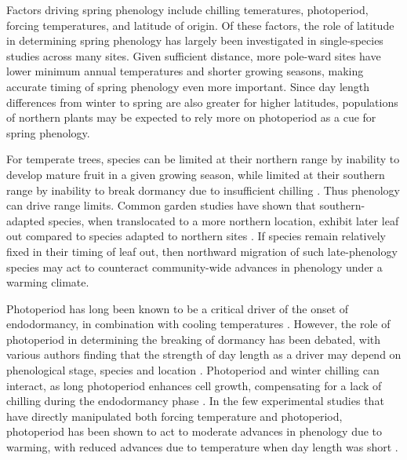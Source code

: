 \documentclass[11pt]{article}
\begin{document}
Factors driving spring phenology include chilling temeratures, photoperiod, forcing temperatures, and latitude of origin. Of these factors, the role of latitude in determining spring phenology has largely been investigated in single-species studies across many sites. Given sufficient distance, more pole-ward sites have lower minimum annual temperatures and shorter growing seasons, making accurate timing of spring phenology even more important. Since day length differences from winter to spring are also greater for higher latitudes, populations of northern plants may be expected to rely more on photoperiod as a cue for spring phenology.

For temperate trees, species can be limited at their northern range by inability to develop mature fruit in a given growing season, while limited at their southern range by inability to break dormancy due to insufficient chilling \cite{Chuine:2010}. Thus phenology can drive range limits. Common garden studies have shown that southern-adapted species, when translocated to a more northern location, exhibit later leaf out compared to species adapted to northern sites \cite{Zohner:2014aa}. If species remain relatively fixed in their timing of leaf out, then northward migration of such late-phenology species may act to counteract community-wide advances in phenology under a warming climate. 

Photoperiod has long been known to be a critical driver of the onset of endodormancy, in combination with cooling temperatures \cite{Foley:2009aa}. However, the role of photoperiod in determining the breaking of dormancy has been debated, with various authors finding that the strength of day length as a driver may depend on phenological stage, species and location \cite{Heide:1993}\cite{Falusi:1996aa}. Photoperiod and winter chilling can interact, as long photoperiod enhances cell growth, compensating for a lack of chilling during the endodormancy phase \cite{Heide:1993b}\cite{Caffarra:2011aa}\cite{Myking:1995}. In the few experimental studies that have directly manipulated both forcing temperature and photoperiod, photoperiod has been shown to act to moderate advances in phenology due to warming, with reduced advances due to temperature when day length was short \cite{Sanz-Perez:2009aa}\cite{Heide:1993b}. 

\end{document}
